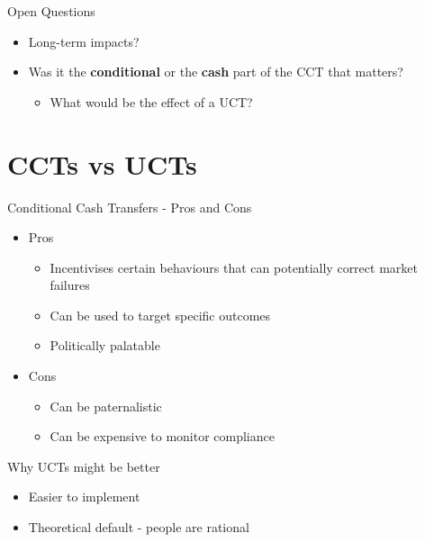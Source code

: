 \documentclass[11pt,notes=hide,aspectratio=169,mathserif]{beamer}
\begin{document}
\begin{frame}{Open Questions}
\begin{itemize}
\item Long-term impacts?
\item Was it the \textbf{conditional} or the \textbf{cash} part of the CCT that matters? 
\begin{itemize}
    \item What would be the effect of a UCT?
\end{itemize}
\end{itemize}
\end{frame}

\section*{CCTs vs UCTs}

\begin{frame}{Conditional Cash Transfers - Pros and Cons}
\begin{itemize}
\item Pros
\begin{itemize}
    \item Incentivises certain behaviours that can potentially correct market failures 
    \item Can be used to target specific outcomes 
    \item Politically palatable
\end{itemize}
\item Cons
\begin{itemize}
    \item Can be paternalistic 
    \item Can be expensive to monitor compliance
\end{itemize}
\end{itemize}
\end{frame}

\begin{frame}{Why UCTs might be better}
\begin{itemize}
\item Easier to implement
\item Theoretical default - people are rational 
\end{itemize}
\end{frame}
\end{document}
